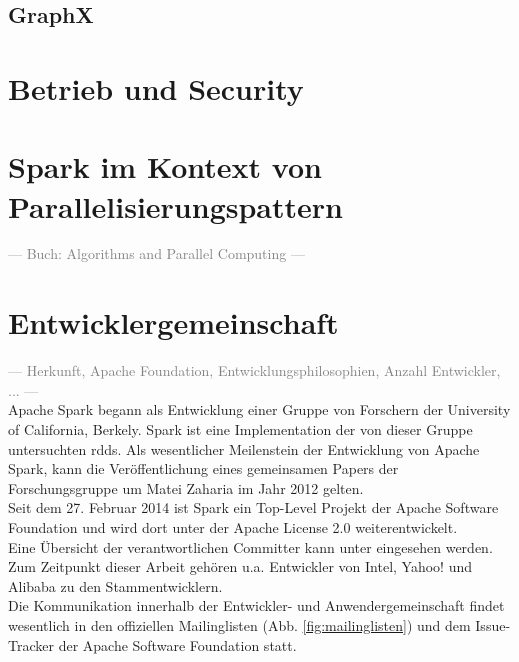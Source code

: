 \subsection{GraphX}

\section{Betrieb und Security}

\section{Spark im Kontext von Parallelisierungspattern}
\textcolor{gray}{--- Buch: Algorithms and Parallel Computing ---}\\

\section{Entwicklergemeinschaft}
\textcolor{gray}{--- Herkunft, Apache Foundation, Entwicklungsphilosophien, Anzahl Entwickler, ... ---}\\

Apache Spark begann als Entwicklung einer Gruppe von Forschern der University of California, Berkely. Spark ist eine Implementation der von dieser Gruppe untersuchten \glspl{rdd}\cite{Mat12}. Als wesentlicher Meilenstein der Entwicklung von Apache Spark, kann die Veröffentlichung eines gemeinsamen Papers der Forschungsgruppe um Matei Zaharia im Jahr 2012 gelten.\\

Seit dem 27. Februar 2014\cite{apacheblog} ist Spark ein Top-Level Projekt der Apache Software Foundation\cite{apache} und wird dort unter der Apache License 2.0\cite{apachelic} weiterentwickelt.\\

Eine Übersicht der verantwortlichen Committer kann unter \cite{committer} eingesehen werden.
Zum Zeitpunkt dieser Arbeit gehören u.a. Entwickler von Intel, Yahoo! und Alibaba zu den Stammentwicklern.\\

Die Kommunikation innerhalb der Entwickler- und Anwendergemeinschaft findet wesentlich in den offiziellen Mailinglisten (Abb. \ref{fig:mailinglisten}) und dem Issue-Tracker\cite{issuetracker} der Apache Software Foundation statt.

